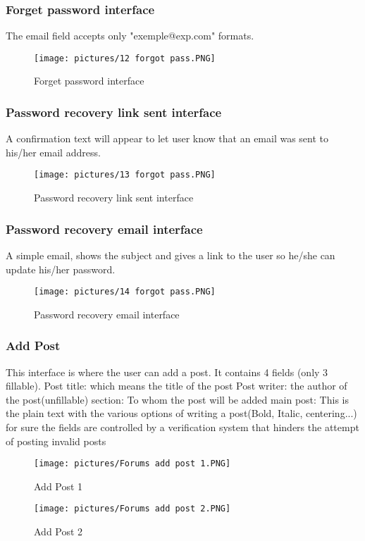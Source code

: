 \documentclass[12pt]{report}
\begin{document}
\subsubsection{Forget password interface}
The email field accepts only "exemple@exp.com" formats.
\begin{figure}[!htbp]
    \centering
    \texttt{[image: pictures/12 forgot pass.PNG]}
    \caption{Forget password interface}
    \label{fig:12}
\end{figure}
\pagebreak
\subsubsection{Password recovery link sent interface}
A confirmation text will appear to let user know that an email was sent to his/her email address. 
\begin{figure}[!htbp]
    \centering
    \texttt{[image: pictures/13 forgot pass.PNG]}
    \caption{Password recovery link sent interface}
    \label{fig:13}
\end{figure}
\subsubsection{Password recovery email interface}
A simple email, shows the subject and gives a link to the user so he/she can update his/her password.
\begin{figure}[!htbp]
    \centering
    \texttt{[image: pictures/14 forgot pass.PNG]}
    \caption{Password recovery email interface}
    \label{fig:14}
\end{figure}




\pagebreak

\subsubsection{Add Post}
This interface is where the user can add a post. It contains 4 fields (only 3 fillable).\newline
Post title: which means the title of the post\newline
Post writer: the author of the post(unfillable)\newline
section: To whom the post will be added\newline
main post: This is the plain text with the various options of writing a post(Bold, Italic, centering...)\newline
for sure the fields are controlled by a verification system that hinders the attempt of posting invalid posts
\begin{figure}[!htbp]
    \centering
    \texttt{[image: pictures/Forums add post 1.PNG]}
    \caption{Add Post 1}
    \label{fig:14}
\end{figure}
\begin{figure}[!htbp]
    \centering
    \texttt{[image: pictures/Forums add post 2.PNG]}
    \caption{Add Post 2}
    \label{fig:14}
\end{figure}
\pagebreak
\end{document}

